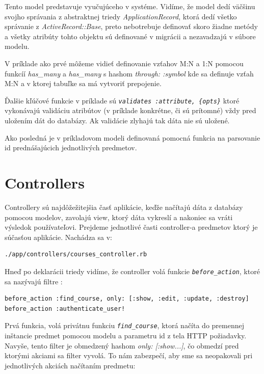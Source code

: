 Tento model predstavuje vyučujúceho v systéme. Vidíme, že model dedí väčšinu svojho správania z abstraktnej triedy \emph{ApplicationRecord}, ktorá dedí všetko správanie z \emph{ActiveRecord::Base}, preto nebotrebuje definovať skoro žiadne metódy a všetky atribúty tohto objektu sú definované v migrácii a nezavadzajú v súbore modelu. 

V príklade ako prvé môžeme vidieť definovanie vzťahov M:N a 1:N pomocou funkcíí \emph{has\_many} a \emph{has\_many} s hashom \emph{through: :symbol} kde sa definuje vzťah M:N a v ktorej tabuľke sa má vytvoriť prepojenie.

Ďalšie kľúčové funkcie v príklade sú \emph{\texttt{validates :attribute, \{opts\}}} ktoré vykonávajú validáciu atribútov (v príklade konkrétne, či sú prítomné) vždy pred uložením dát do databázy. Ak validácie zlyhajú tak dáta nie sú uložené.

Ako posledná je v príkladovom modeli definovaná pomocná funkcia na parsovanie id prednášajúcich jednotlivých predmetov. 

\section{Controllers}

Controllery sú najdôžežitejšia časť aplikácie, keďže načítajú dáta z databázy pomocou modelov, zavolajú view, ktorý dáta vykreslí a nakoniec sa vráti výsledok používateľovi. Prejdeme jednotlivé časti controller-a predmetov ktorý je súčasťou aplikácie. Nachádza sa v:

\begin{verbatim}
./app/controllers/courses_controller.rb
\end{verbatim}

Hneď po deklarácii triedy vidíme, že controller volá funkcie \emph{\texttt{before\_action}}, ktoré sa nazývajú filtre \citep{web:guides_filters}:

\begin{verbatim}
before_action :find_course, only: [:show, :edit, :update, :destroy]
before_action :authenticate_user!
\end{verbatim}

Prvá funkcia, volá privátnu funkciu \emph{\texttt{find\_course}}, ktorá načíta do premennej inštancie predmet pomocou modelu a parametru id z tela HTTP požiadavky. Navyše, tento filter je obmedzený hashom \emph{only: [:show...]}, čo obmedzí pred ktorými akciami sa filter vyvolá. To nám zabezpečí, aby sme sa neopakovali pri jednotlivých akciách načítaním predmetu:

